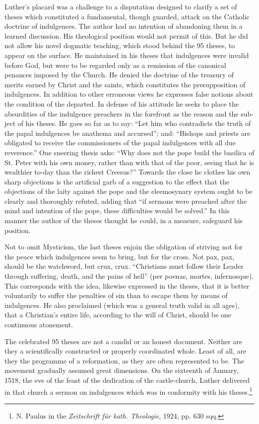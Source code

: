 Luther’s placard was a challenge to a disputation designed to clarify a
set of theses which constituted a fundamental, though guarded,
attack on the Catholic doctrine of indulgences. The author had no
intention of abandoning them in a learned discussion. His theological
position would not permit of this. But he did not allow his novel
dogmatic teaching, which stood behind the 95 theses, to appear on
the surface. He maintained in his theses that indulgences were invalid
before God, but were to be regarded only as a remission of the
canonical penances imposed by the Church. He denied the doctrine
of the treasury of merits earned by Christ and the saints, which
constitutes the presupposition of indulgences. In addition to other
erroneous views he expresses false notions about the condition of the
departed. In defense of his attitude he seeks to place the absurdities
of the indulgence preachers in the forefront as the reason and the sub-
ject of his theses. He goes so far as to say: “Let him who contradicts
the truth of the papal indulgences be anathema and accursed”; and:
“Bishops and priests are obligated to receive the commissioners of
the papal indulgences with all due reverence.” One sneering thesis
asks: “Why does not the pope build the basilica of St. Peter with his
own money, rather than with that of the poor, seeing that he is
wealthier to-day than the richest Creesus?” Towards the close he
clothes his own sharp objections is the artificial garb of a suggestion
to the effect that the objections of the laity against the pope and the
eleemosynary system ought to be clearly and thoroughly refuted,
adding that “if sermons were preached after the mind and intention
of the pope, these difficulties would be solved.” In this manner the
author of the theses thought he could, in a measure, safeguard his
position.

Not to omit Mysticism, the last theses enjoin the obligation of
striving not for the peace which indulgences seem to bring, but for
the cross. Not pax, pax, should be the watchword, but crux, crux.
“Christians must follow their Leader through suffering, death, and
the pains of hell” (per poenas, mortes, infernosque). This corresponds
with the idea, likewise expressed in the theses, that it is better voluntarily
to suffer the penalties of sin than to escape them by means of indulgences.
He also proclaimed (which was a general truth valid in
all ages), that a Christian’s entire life, according to the will of Christ,
should be one continuous atonement.

The celebrated 95 theses are not a candid or an honest document.
Neither are they a scientifically constructed or properly coordinated
whole. Least of all, are they the programme of a reformation, as they
are often represented to be.
The movement gradually assumed great dimensions. On the sixteenth
of January, 1518, the eve of the feast of the dedication of the
castle-church, Luther delivered in that church a sermon on indulgences
which was in conformity with his theses.\footnote
{N. Paulus in the \textit{Zeitschrift für kath. Theologie}, 1924, pp. 630 sqq.}

